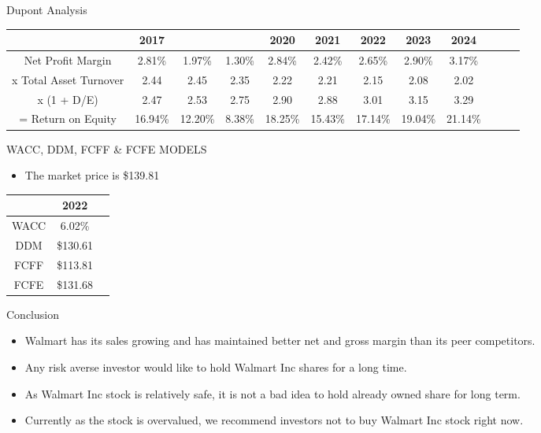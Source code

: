 \documentclass[pdf]{beamer}
\theoremstyle{remark}
\theoremstyle{definition}
\begin{document}
\begin{frame}[allowframebreaks]{Dupont Analysis}
		\begin{table}[!ht]
		\fontsize{6.5}{20}\selectfont
		\centering
		\begin{tabular}{|c|c|c|c|c|c|c|c|c|c|c|c}
			\hline
			\rowcolor{blue}
			   &2017 & \makecell{2018} & \makecell{2019} & 2020&2021&\rowcolor{green}2022&2023&2024\\%
			\hline
			Net Profit
			Margin&2.81\% &1.97\%&1.30\%&2.84\%&2.42\%&2.65\%&2.90\%&3.17\%\\%
			x Total Asset Turnover&2.44 &2.45 &2.35 &2.22 &2.21 &2.15 &2.08 &2.02 \\
			x (1 + D/E)&2.47 &2.53 &2.75 &2.90 &2.88 &3.01 &3.15 &3.29 \\
		= Return on Equity&16.94\%&12.20\%&8.38\%&18.25\%&15.43\%&17.14\%&19.04\%&21.14\%\\
			\hline
		\end{tabular}
	\end{table}

\end{frame}


\begin{frame}[allowframebreaks]{WACC, DDM, FCFF \& FCFE MODELS}
	\begin{itemize}
		\item The market price is \$139.81
	\end{itemize}
   \begin{table}[!ht]
	\fontsize{15}{25}\selectfont
	\centering
	\begin{tabular}{|c|c|c|}
		\hline
		\rowcolor{blue}
	& \rowcolor{green}2022\\%
		\hline
	WACC&  6.02\%\\%
		DDM  & \$130.61 \\
	FCFF&\$113.81 \\
	FCFE & \$131.68\\
		\hline
	\end{tabular}
   \end{table}
\end{frame}


\begin{frame}[allowframebreaks]{Conclusion}
\begin{itemize}
	\item Walmart has its sales growing and has maintained better net and gross margin than its peer competitors. 
	\item Any risk averse investor would like to hold Walmart Inc shares for a long time.
	\item As Walmart Inc stock is relatively safe, it is not a bad idea to hold already owned share for long term. \item Currently as the stock is overvalued, we recommend investors not to buy Walmart Inc stock right now. 
\end{itemize}

                
\end{frame}

	
	
\end{document}

